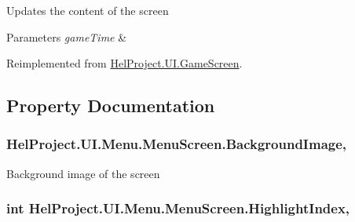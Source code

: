 Updates the content of the screen 


\begin{DoxyParams}{Parameters}
{\em game\+Time} & \\
\hline
\end{DoxyParams}


Reimplemented from \hyperlink{class_hel_project_1_1_u_i_1_1_game_screen_a4aefe31814b0081be3ba4f1243b8cee6}{Hel\+Project.\+U\+I.\+Game\+Screen}.



\subsection{Property Documentation}
\hypertarget{class_hel_project_1_1_u_i_1_1_menu_1_1_menu_screen_a3f4d85faa700315baaa4a5f40bf3576e}{}
\subsubsection[{Background\+Image}]{ Hel\+Project.\+U\+I.\+Menu.\+Menu\+Screen.\+Background\+Image\hspace{0.3cm}{\ttfamily [get]}, {\ttfamily [set]}}\label{class_hel_project_1_1_u_i_1_1_menu_1_1_menu_screen_a3f4d85faa700315baaa4a5f40bf3576e}


Background image of the screen 

\hypertarget{class_hel_project_1_1_u_i_1_1_menu_1_1_menu_screen_ad673eedc194957e3e8ecd157bf954f9c}{}
\subsubsection[{Highlight\+Index}]{\setlength{\rightskip}{0pt plus 5cm}int Hel\+Project.\+U\+I.\+Menu.\+Menu\+Screen.\+Highlight\+Index\hspace{0.3cm}{\ttfamily [get]}, {\ttfamily [set]}}\label{class_hel_project_1_1_u_i_1_1_menu_1_1_menu_screen_ad673eedc194957e3e8ecd157bf954f9c}


